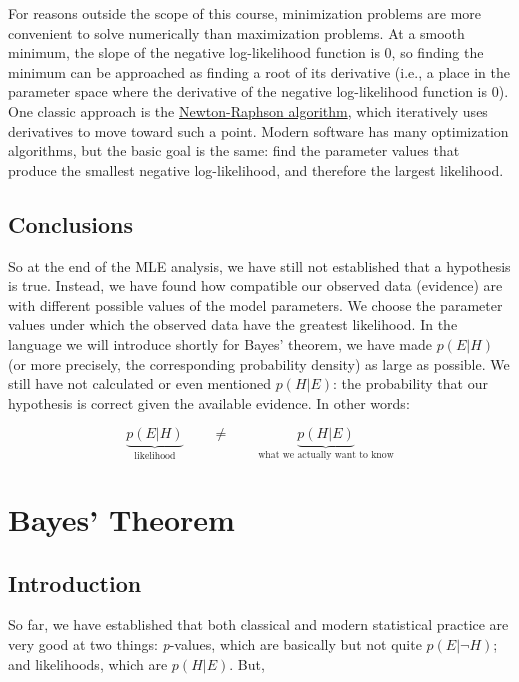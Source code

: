 \documentclass[
  13,
  letterpaper,
]{report}
\begin{document}
For reasons outside the scope of this course, minimization problems are
more convenient to solve numerically than maximization problems. At a
smooth minimum, the slope of the negative log-likelihood function is 0,
so finding the minimum can be approached as finding a root of its
derivative (i.e., a place in the parameter space where the derivative of
the negative log-likelihood function is 0). One classic approach is the
\href{https://en.wikipedia.org/wiki/Newton\%27s_method}{Newton-Raphson
algorithm}, which iteratively uses derivatives to move toward such a
point. Modern software has many optimization algorithms, but the basic
goal is the same: find the parameter values that produce the smallest
negative log-likelihood, and therefore the largest likelihood.

\subsection{Conclusions}\label{sec-intro-mle-conc}

So at the end of the MLE analysis, we have still not established that a
hypothesis is true. Instead, we have found how compatible our observed
data (evidence) are with different possible values of the model
parameters. We choose the parameter values under which the observed data
have the greatest likelihood. In the language we will introduce shortly
for Bayes' theorem, we have made \(p\left(E|H\right)\) (or more
precisely, the corresponding probability density) as large as possible.
We still have not calculated or even mentioned \(p\left(H|E\right)\):
the probability that our hypothesis is correct given the available
evidence. In other words:

\[\underbrace{p\left(E|H\right)}_{\text{likelihood}}\qquad\neq\qquad \underbrace{p\left(H|E\right)}_{\text{what we actually want to know}}\]

\section{Bayes' Theorem}\label{sec-intro-bayes}

\subsection{Introduction}\label{sec-intro-bayes-intro}

So far, we have established that both classical and modern statistical
practice are very good at two things: \emph{p}-values, which are
basically but not quite \(p\left(E|\lnot H\right)\); and likelihoods,
which are \(p\left(H|E\right)\). But,
\end{document}
